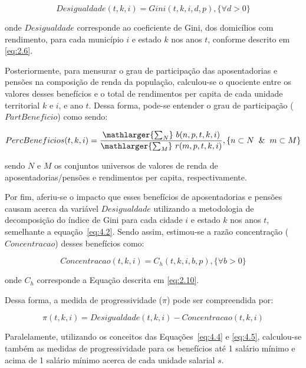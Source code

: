 \begin{equation}\label{eq:4.2}
    Desigualdade(t, k, i) = Gini(t, k, i, d, p), \{\forall d > 0\}
\end{equation}

\noindent onde $Desigualdade$ corresponde ao coeficiente de Gini, dos domicílios com rendimento, para cada município $i$ e estado $k$ nos anos $t$, conforme descrito em \ref{eq:2.6}.

Posteriormente, para mensurar o grau de participação das aposentadorias e pensões na composição de renda da população, calculou-se o quociente entre os valores desses benefícios e o total de rendimentos per capita de cada unidade territorial $k$ e $i$, e ano $t$. Dessa forma, pode-se entender o grau de participação ($PartBeneficio$) como sendo: 

\begin{equation}
    PercBeneficios(t, k, i) = \dfrac{\mathlarger{\sum_{N}} \ b(n, p, t, k, i)}{\mathlarger{\sum_{M}} \ r(m, p, t, k, i)}, \{n \subset N \And m \subset M\}
\end{equation}

\noindent sendo $N$ e $M$ os conjuntos universos de valores de renda de aposentadorias/pensões e rendimentos per capita, respectivamente.

Por fim, aferiu-se o impacto que esses benefícios de aposentadorias e pensões causam acerca da variável $Desigualdade$ utilizando a metodologia de decomposição do índice de Gini para cada cidade $i$ e estado $k$ nos anos $t$, semelhante a equação~\ref{eq:4.2}. Sendo assim, estimou-se a razão concentração ($Concentracao$) desses benefícios como:

\begin{equation}\label{eq:4.4}
    Concentracao (t, k, i) = C_h(t, k, i, b, p), \{\forall b > 0\}
\end{equation}

\noindent onde $C_h$ corresponde a Equação descrita em \ref{eq:2.10}. 

Dessa forma, a medida de progressividade ($\pi$) pode ser compreendida por:

\begin{equation}\label{eq:4.5}
    \pi(t, k, i) = Desigualdade(t, k, i) - Concentracao (t, k, i)
\end{equation}

Paralelamente, utilizando os conceitos das Equações~\ref{eq:4.4} e \ref{eq:4.5}, calculou-se também as medidas de progressividade para os benefícios até 1 salário mínimo e acima de 1 salário mínimo acerca de cada unidade salarial $s$. 

